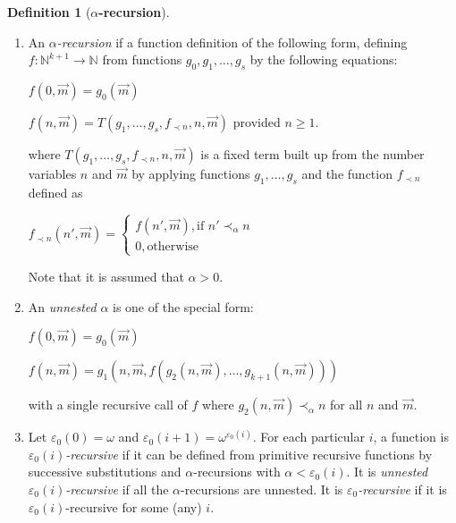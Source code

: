 \documentclass[8pt]{article}
\theoremstyle{definition}
\newtheorem{definition}{Definition}[section]
\theoremstyle{definition}
\theoremstyle{definition}
\theoremstyle{definition}
\theoremstyle{definition}
\theoremstyle{definition}
\theoremstyle{definition}
\theoremstyle{definition}
\theoremstyle{definition}
\theoremstyle{definition}
\theoremstyle{definition}
\theoremstyle{definition}
\theoremstyle{definition}
\theoremstyle{question}
\begin{document}
\begin{definition}[\bf $\alpha$-recursion]
  $ $

  \begin{enumerate}
    \item An \emph{$\alpha$-recursion} if a function definition of the following form, 
    defining $f : \mathbb{N}^{k + 1} \to \mathbb{N}$ from functions $g_0, g_1, \dots, g_s$ by the following equations:
    \begin{center}
      $f(0, \vec{m}) = g_0(\vec{m})$

      $f(n, \vec{m}) = T(g_1, \dots, g_s, f_{\prec n}, n, \vec{m})$ provided $n \geq 1$.
    \end{center}
    where $T(g_1, \dots, g_s, f_{\prec n}, n, \vec{m})$ is a fixed term built up from the number variables
    $n$ and $\vec{m}$ by applying functions $g_1, \dots, g_s$ and the function $f_{\prec n}$ defined as
    \begin{center}
      $f_{\prec n}(n', \vec{m}) = \begin{cases}
        f(n', \vec{m}), \text{if $n' \prec_{\alpha} n$} \\
        0, \text{otherwise}
      \end{cases}$
    \end{center}
    Note that it is assumed that $\alpha > 0$.
    \item An \emph{unnested} $\alpha$ is one of the special form:

    \begin{center}
      $f(0, \vec{m}) = g_0(\vec{m})$

      $f(n, \vec{m}) = g_1(n, \vec{m}, f(g_2(n, \vec{m}), \dots, g_{k + 1}(n, \vec{m})))$
    \end{center}
    with a single recursive call of $f$ where $g_2(n, \vec{m}) \prec_{\alpha} n$ for all $n$ and $\vec{m}$.
    \item Let $\varepsilon_0(0) = \omega$ and $\varepsilon_0(i + 1) = \omega^{\varepsilon_0(i)}$.
    For each particular $i$, a function is \emph{$\varepsilon_0(i)$-recursive} if it can be defined
    from primitive recursive functions by successive substitutions and $\alpha$-recursions with 
    $\alpha < \varepsilon_0(i)$. It is \emph{unnested $\varepsilon_0(i)$-recursive} if all the $\alpha$-recursions
    are unnested. It is \emph{$\varepsilon_0$-recursive} if it is $\varepsilon_0(i)$-recursive for some (any) $i$.
  \end{enumerate}
\end{definition}
\end{document}
